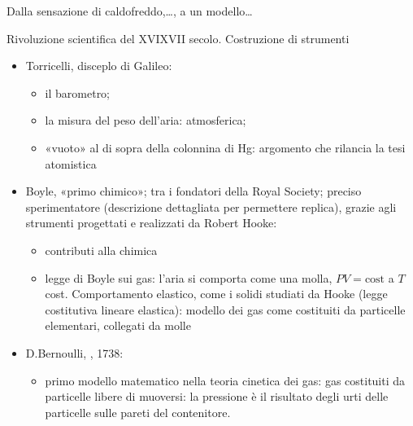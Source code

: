\documentclass[letterpaper,10pt,italian]{jupyterBook}
\begin{document}
\sphinxAtStartPar
{}
Dalla sensazione di caldo\sphinxhyphen{}freddo,…, a un modello…



\sphinxAtStartPar
{} Rivoluzione scientifica del XVI\sphinxhyphen{}XVII secolo. Costruzione di strumenti
\begin{itemize}
\item {} 
\sphinxAtStartPar
Torricelli, disceplo di Galileo:
\begin{itemize}
\item {} 
\sphinxAtStartPar
il barometro;

\item {} 
\sphinxAtStartPar
la misura del peso dell’aria:  atmosferica;

\item {} 
\sphinxAtStartPar
«vuoto» al di sopra della colonnina di Hg: argomento che rilancia la tesi atomistica

\end{itemize}

\item {} 
\sphinxAtStartPar
Boyle, «primo chimico»; tra i fondatori della Royal Society; preciso sperimentatore (descrizione dettagliata per permettere replica), grazie agli strumenti progettati e realizzati da Robert Hooke:
\begin{itemize}
\item {} 
\sphinxAtStartPar
contributi alla chimica

\item {} 
\sphinxAtStartPar
legge di Boyle sui gas: l’aria si comporta come una molla, \(PV = \text{cost}\) a \(T\) cost. Comportamento elastico, come i solidi studiati da Hooke (legge costitutiva lineare elastica): modello dei gas come costituiti da particelle elementari, collegati da molle

\end{itemize}

\item {} 
\sphinxAtStartPar
D.Bernoulli, , 1738:
\begin{itemize}
\item {} 
\sphinxAtStartPar
primo modello matematico nella teoria cinetica dei gas: gas costituiti da particelle libere di muoversi: la pressione è il risultato degli urti delle particelle sulle pareti del contenitore.

\end{itemize}


\end{itemize}
\end{document}
